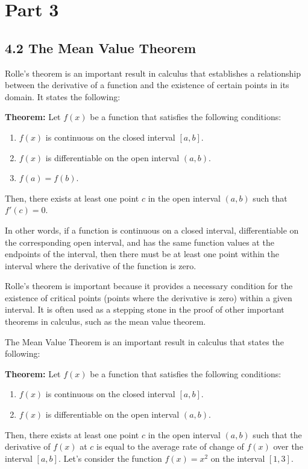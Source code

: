 \documentclass{article}
\begin{document}

\section{Part 3}

\subsection{4.2 The Mean Value Theorem}

Rolle's theorem is an important result in calculus that establishes a relationship between the derivative of a function and the existence of certain points in its domain. It states the following:

\textbf{Theorem:} Let $f(x)$ be a function that satisfies the following conditions:
\begin{enumerate}
    \item $f(x)$ is continuous on the closed interval $[a, b]$.
    \item $f(x)$ is differentiable on the open interval $(a, b)$.
    \item $f(a) = f(b)$.
\end{enumerate}
Then, there exists at least one point $c$ in the open interval $(a, b)$ such that $f'(c) = 0$.

In other words, if a function is continuous on a closed interval, differentiable on the corresponding open interval, and has the same function values at the endpoints of the interval, then there must be at least one point within the interval where the derivative of the function is zero.

Rolle's theorem is important because it provides a necessary condition for the existence of critical points (points where the derivative is zero) within a given interval. It is often used as a stepping stone in the proof of other important theorems in calculus, such as the mean value theorem.

The Mean Value Theorem is an important result in calculus that states the following:

\textbf{Theorem:} Let $f(x)$ be a function that satisfies the following conditions: \begin{enumerate} \item $f(x)$ is continuous on the closed interval $[a, b]$. \item $f(x)$ is differentiable on the open interval $(a, b)$. \end{enumerate} Then, there exists at least one point $c$ in the open interval $(a, b)$ such that the derivative of $f(x)$ at $c$ is equal to the average rate of change of $f(x)$ over the interval $[a, b]$.
Let's consider the function $f(x) = x^2$ on the interval $[1, 3]$.
\end{document}

